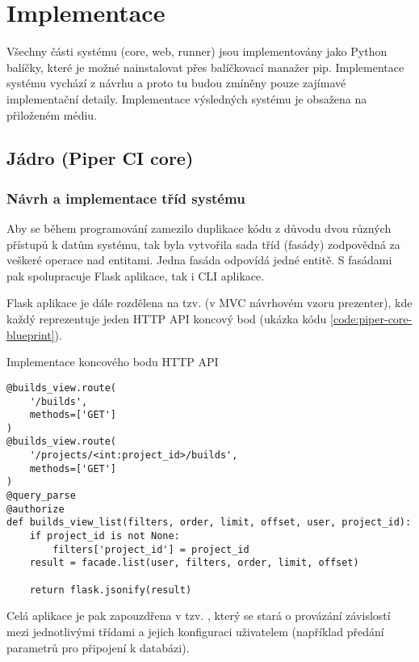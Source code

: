 \chapter{Implementace}

Všechny části systému (core, web, runner) jsou implementovány jako Python balíčky, které je možné nainstalovat přes balíčkovací manažer pip.
Implementace systému vychází z návrhu a proto tu budou zmíněny pouze zajímavé implementační detaily.
Implementace výsledných systému je obsažena na přiloženém médiu.

\section{Jádro (Piper CI core)}

\subsection{Návrh a implementace tříd systému}


Aby se během programování zamezilo duplikace kódu z důvodu dvou různých přístupů k datům systému, tak byla vytvořila sada tříd (fasády) zodpovědná za veškeré operace nad entitami.
Jedna fasáda odpovídá jedné entitě.
S fasádami pak spolupracuje Flask aplikace, tak i CLI aplikace.

Flask aplikace je dále rozdělena na tzv.  (v MVC návrhovém vzoru prezenter), kde každý reprezentuje jeden HTTP API koncový bod (ukázka kódu \ref{code:piper-core-blueprint}).

\begin{listing}[ht]
\caption{\label{code:piper-core-blueprint}Implementace koncového bodu HTTP API}
\begin{verbatim}
@builds_view.route(
    '/builds',
    methods=['GET']
)
@builds_view.route(
    '/projects/<int:project_id>/builds',
    methods=['GET']
)
@query_parse
@authorize
def builds_view_list(filters, order, limit, offset, user, project_id):
    if project_id is not None:
        filters['project_id'] = project_id
    result = facade.list(user, filters, order, limit, offset)

    return flask.jsonify(result)
\end{verbatim}
\end{listing}

Celá aplikace je pak zapouzdřena v tzv. , který se stará o provázání závislostí mezi jednotlivými třídami a jejich konfiguraci uživatelem (například předání parametrů pro připojení k databázi).

